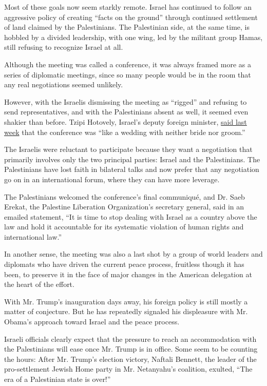 Most of these goals now seem starkly remote. Israel has continued to
follow an aggressive policy of creating ``facts on the ground'' through
continued settlement of land claimed by the Palestinians. The
Palestinian side, at the same time, is hobbled by a divided leadership,
with one wing, led by the militant group Hamas, still refusing to
recognize Israel at all.

Although the meeting was called a conference, it was always framed more
as a series of diplomatic meetings, since so many people would be in the
room that any real negotiations seemed unlikely.

However, with the Israelis dismissing the meeting as ``rigged'' and
refusing to send representatives, and with the Palestinians absent as
well, it seemed even shakier than before. Tzipi Hotovely, Israel's
deputy foreign minister,
\href{https://www.nytimes.com/2017/01/15/world/middleeast/missing-at-israel-palestinian-peace-conference-israelis-or-palestinians.html}{said
last week} that the conference was ``like a wedding with neither bride
nor groom.''

The Israelis were reluctant to participate because they want a
negotiation that primarily involves only the two principal parties:
Israel and the Palestinians. The Palestinians have lost faith in
bilateral talks and now prefer that any negotiation go on in an
international forum, where they can have more leverage.

The Palestinians welcomed the conference's final communiqué, and Dr.
Saeb Erekat, the Palestine Liberation Organization's secretary general,
said in an emailed statement, ``It is time to stop dealing with Israel
as a country above the law and hold it accountable for its systematic
violation of human rights and international law.''

In another sense, the meeting was also a last shot by a group of world
leaders and diplomats who have driven the current peace process,
fruitless though it has been, to preserve it in the face of major
changes in the American delegation at the heart of the effort.

With Mr. Trump's inauguration days away, his foreign policy is still
mostly a matter of conjecture. But he has repeatedly signaled his
displeasure with Mr. Obama's approach toward Israel and the peace
process.

Israeli officials clearly expect that the pressure to reach an
accommodation with the Palestinians will ease once Mr. Trump is in
office. Some seem to be counting the hours: After Mr. Trump's election
victory, Naftali Bennett, the leader of the pro-settlement Jewish Home
party in Mr. Netanyahu's coalition, exulted, ``The era of a Palestinian
state is over!''

